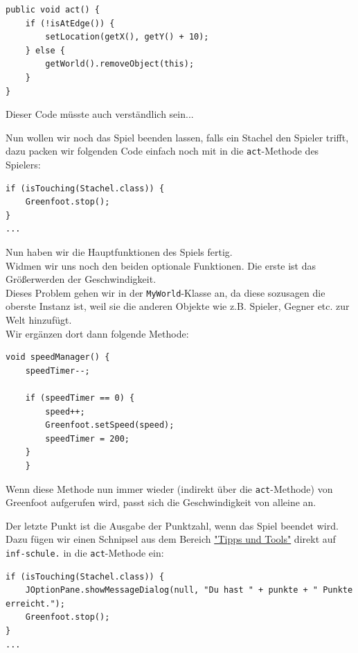 \documentclass{scrartcl}   %
\begin{document}
\begin{lstlisting}
public void act() {
    if (!isAtEdge()) {
        setLocation(getX(), getY() + 10);
    } else {
        getWorld().removeObject(this);
    }
}
\end{lstlisting}

Dieser Code müsste auch verständlich sein...

Nun wollen wir noch das Spiel beenden lassen, falls ein Stachel den Spieler trifft, dazu packen wir folgenden Code einfach noch mit in die \texttt{act}-Methode des Spielers:\\

\begin{lstlisting}
if (isTouching(Stachel.class)) {
    Greenfoot.stop();
}
...
\end{lstlisting}


Nun haben wir die Hauptfunktionen des Spiels fertig.\\
Widmen wir uns noch den beiden optionale Funktionen. Die erste ist das Größerwerden der Geschwindigkeit.\\
Dieses Problem gehen wir in der \texttt{MyWorld}-Klasse an, da diese sozusagen die oberste Instanz ist, weil sie die anderen Objekte wie z.B. Spieler, Gegner etc. zur Welt hinzufügt.\\
Wir ergänzen dort dann folgende Methode:\\

\begin{lstlisting}
void speedManager() {
    speedTimer--;
    
    if (speedTimer == 0) {
        speed++;
        Greenfoot.setSpeed(speed);
        speedTimer = 200;
    }
    }
\end{lstlisting}

Wenn diese Methode nun immer wieder (indirekt über die \texttt{act}-Methode) von Greenfoot aufgerufen wird, passt sich die Geschwindigkeit von alleine an.

Der letzte Punkt ist die Ausgabe der Punktzahl, wenn das Spiel beendet wird.\\
Dazu fügen wir einen Schnipsel aus dem Bereich \href{https://www.inf-schule.de/programmierung/oopjava/anhang}{"Tipps und Tools"} direkt auf \texttt{inf-schule.} in die \texttt{act}-Methode ein:

\newpage

\begin{lstlisting}
if (isTouching(Stachel.class)) {
    JOptionPane.showMessageDialog(null, "Du hast " + punkte + " Punkte erreicht.");
    Greenfoot.stop();
}
...
\end{lstlisting}
\end{document}
